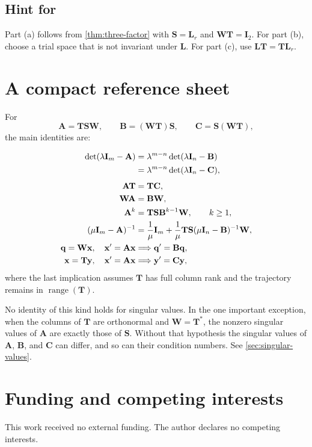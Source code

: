\documentclass[11pt]{article}
\newcommand{\I}{\mathbf{I}}
\newcommand{\mat}[1]{\mathbf{#1}}
\newcommand{\vect}[1]{\mathbf{#1}}
\newcommand{\range}{\operatorname{range}}
\theoremstyle{definition}
\theoremstyle{remark}
\begin{document}
\subsection*{Hint for }

Part (a) follows from \cref{thm:three-factor} with
\(\mat{S}=\mat{L}_r\) and \(\mat{W}\mat{T}=\I_2\). For part (b), choose a trial space that is not invariant under \(\mat{L}\). For part (c), use
\(\mat{L}\mat{T}=\mat{T}\mat{L}_r\).

\section{A compact reference sheet}
\label{app:reference}

For
\[
  \mat{A}=\mat{T}\mat{S}\mat{W},
  \qquad
  \mat{B}=(\mat{W}\mat{T})\mat{S},
  \qquad
  \mat{C}=\mat{S}(\mat{W}\mat{T}),
\]
the main identities are:

\begin{align}
  \det(\lambda\I_m-\mat{A})
  &=\lambda^{m-n}\det(\lambda\I_n-\mat{B})
  \notag\\
  &=\lambda^{m-n}\det(\lambda\I_n-\mat{C}),
  \label{eq:reference-char}\\[4pt]
  \mat{A}\mat{T}&=\mat{T}\mat{C},
  \label{eq:reference-AT}\\
  \mat{W}\mat{A}&=\mat{B}\mat{W},
  \label{eq:reference-WA}\\
  \mat{A}^k&=\mat{T}\mat{S}\mat{B}^{k-1}\mat{W},
  \qquad k\geq1,
  \label{eq:reference-powers}\\
  (\mu\I_m-\mat{A})^{-1}
  &=\frac1\mu\I_m
   +\frac1\mu\mat{T}\mat{S}
    (\mu\I_n-\mat{B})^{-1}\mat{W},
  \label{eq:reference-resolvent}\\
  \vect{q}=\mat{W}\vect{x},
  \quad \vect{x}'=\mat{A}\vect{x}
  &\Longrightarrow
  \vect{q}'=\mat{B}\vect{q},
  \label{eq:reference-q}\\
  \vect{x}=\mat{T}\vect{y},
  \quad \vect{x}'=\mat{A}\vect{x}
  &\Longrightarrow
  \vect{y}'=\mat{C}\vect{y},
  \label{eq:reference-y}
\end{align}
where the last implication assumes \(\mat{T}\) has full column rank and the trajectory remains in \(\range(\mat{T})\).

No identity of this kind holds for singular values. In the one important exception, when the columns of \(\mat{T}\) are orthonormal and \(\mat{W}=\mat{T}^{*}\), the nonzero singular values of \(\mat{A}\) are exactly those of \(\mat{S}\). Without that hypothesis the singular values of \(\mat{A}\), \(\mat{B}\), and \(\mat{C}\) can differ, and so can their condition numbers. See \cref{sec:singular-values}.

\section*{Funding and competing interests}

This work received no external funding. The author declares no competing interests.

\printbibliography
\end{document}
